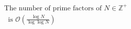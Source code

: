 \documentclass[preview]{standalone}
\begin{document}
\begin{align*}
\text{The number of prime factors of } N \in \mathbb{Z^+} \\ \
                                        \text{ is } \mathcal{O}\left(\frac{\log N}{\log \log N}\right)
\end{align*}
\end{document}
